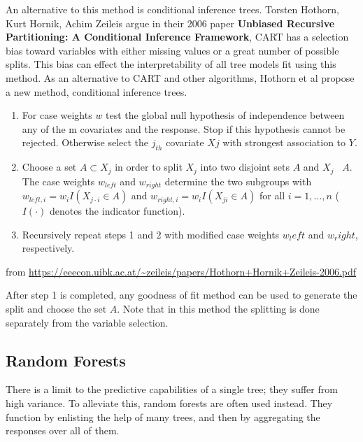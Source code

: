 \documentclass[12pt,twoside]{reedthesis}
\begin{document}
  An alternative to this method is conditional inference trees. Torsten
  Hothorn, Kurt Hornik, Achim Zeileis argue in their 2006 paper
  \textbf{Unbiased Recursive Partitioning: A Conditional Inference
  Framework}, CART has a selection bias toward variables with either
  missing values or a great number of possible splits. This bias can
  effect the interpretability of all tree models fit using this method. As
  an alternative to CART and other algorithms, Hothorn et al propose a new
  method, conditional inference trees.
  
  \begin{enumerate}
  \def\labelenumi{\arabic{enumi}.}
  \item
    For case weights \(w\) test the global null hypothesis of independence
    between any of the m covariates and the response. Stop if this
    hypothesis cannot be rejected. Otherwise select the \(j_{th}\)
    covariate \(Xj\) with strongest association to \(Y\).
  \item
    Choose a set \(A \subset X_{j}\) in order to split \(X_{j}\) into two
    disjoint sets \(A\) and \(X_{j}\) ~\(A\). The case weights
    \(w_{left}\) and \(w_{right}\) determine the two subgroups with
    \(w_{left,i} = w_iI(X_{j\cdot i} \in A)\) and
    \(w_{right,i} = w_iI(X_{ji} \in A)\) for all \(i = 1,...,n\) (
    \(I(·)\) denotes the indicator function).
  \item
    Recursively repeat steps 1 and 2 with modified case weights \(w_left\)
    and \(w_right\), respectively.
  \end{enumerate}
  
  from
  \url{https://eeecon.uibk.ac.at/~zeileis/papers/Hothorn+Hornik+Zeileis-2006.pdf}
  
  After step 1 is completed, any goodness of fit method can be used to
  generate the split and choose the set \(A\). Note that in this method
  the splitting is done separately from the variable selection.
  
  \subsection{Random Forests}\label{random-forests}
  
  There is a limit to the predictive capabilities of a single tree; they
  suffer from high variance. To alleviate this, random forests are often
  used instead. They function by enlisting the help of many trees, and
  then by aggregating the responses over all of them.
  
\end{document}
